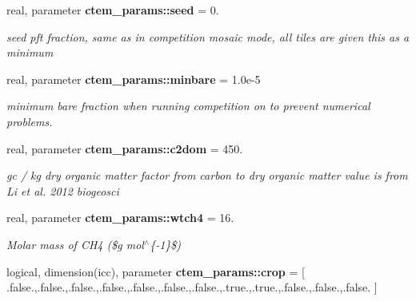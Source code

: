 \begin{DoxyCompactItemize}
\item 
\hypertarget{namespacectem__params_ac9f4780ce317911fbf6daa45a90a8dad}{}real, parameter {\bfseries ctem\+\_\+params\+::seed} = 0.\label{namespacectem__params_ac9f4780ce317911fbf6daa45a90a8dad}

\begin{DoxyCompactList}\small\item\em seed pft fraction, same as in competition  mosaic mode, all tiles are given this as a minimum \end{DoxyCompactList}\item 
\hypertarget{namespacectem__params_a4e93696e56f999aa1005c61d4ed25789}{}real, parameter {\bfseries ctem\+\_\+params\+::minbare} = 1.\+0e-\/5\label{namespacectem__params_a4e93696e56f999aa1005c61d4ed25789}

\begin{DoxyCompactList}\small\item\em minimum bare fraction when running competition on to prevent numerical problems. \end{DoxyCompactList}\item 
\hypertarget{namespacectem__params_a6acddc90acef172ea5a361fd7e628696}{}real, parameter {\bfseries ctem\+\_\+params\+::c2dom} = 450.\label{namespacectem__params_a6acddc90acef172ea5a361fd7e628696}

\begin{DoxyCompactList}\small\item\em gc / kg dry organic matter  factor from carbon to dry organic matter value is from Li et al. 2012 biogeosci \end{DoxyCompactList}\item 
\hypertarget{namespacectem__params_a5246c472162b5b9f071d4e55d87ee84c}{}real, parameter {\bfseries ctem\+\_\+params\+::wtch4} = 16.\label{namespacectem__params_a5246c472162b5b9f071d4e55d87ee84c}

\begin{DoxyCompactList}\small\item\em Molar mass of C\+H4 (\$g mol$^\wedge$\{-\/1\}\$) \end{DoxyCompactList}\item 
\hypertarget{namespacectem__params_ae0f698eacc7fc8a7cfd68a15a90b4e8f}{}logical, dimension(icc), parameter {\bfseries ctem\+\_\+params\+::crop} = \mbox{[} .false.,.false.,.false.,.false.,.false.,.false.,.false.,.true.,.true.,.false.,.false.,.false. \mbox{]}\label{namespacectem__params_ae0f698eacc7fc8a7cfd68a15a90b4e8f}


\end{DoxyCompactItemize}
